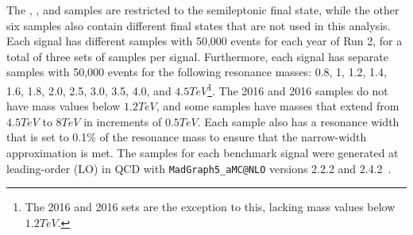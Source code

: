 The \DY\WprtoWH, \DY\WprtoWZ, and \ggF\GBulktoWW samples are restricted to the semileptonic final state, while the other six samples also contain different final states that are not used in this analysis.
Each signal has different samples with 50,000 events for each year of Run 2, for a total of three sets of samples per signal.
Furthermore, each signal has separate samples with 50,000 events for the following resonance masses: 0.8, 1, 1.2, 1.4, 1.6, 1.8, 2.0, 2.5, 3.0, 3.5, 4.0, and $4.5\unit{TeV}$\footnote{The 2016 \VBF\ZprtoWW and 2016 \VBF\WprtoWZ sets are the exception to this, lacking mass values below $1.2\unit{TeV}$.}.
The 2016 \VBF\ZprtoWW and 2016 \VBF\WprtoWZ samples do not have mass values below $1.2\unit{TeV}$, and some samples have masses that extend from $4.5\unit{TeV}$ to $8\unit{TeV}$ in increments of $0.5\unit{TeV}$.
Each sample also has a resonance width that is set to 0.1\% of the resonance mass to ensure that the narrow-width approximation is met.
The samples for each benchmark signal were generated at leading-order (LO) in QCD with \texttt{MadGraph5\_aMC@NLO} versions 2.2.2 and 2.4.2~\cite{Alwall_2014}.

